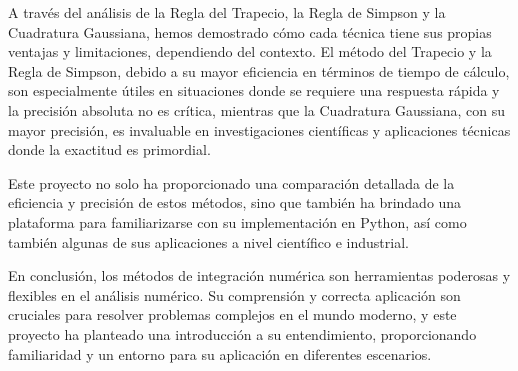 \documentclass[a4paper]{article}
\begin{document}
    A través del análisis de la Regla del Trapecio, la Regla de Simpson y la Cuadratura Gaussiana, hemos demostrado cómo cada técnica tiene sus propias ventajas y limitaciones, dependiendo del contexto. El método del Trapecio y la Regla de Simpson, debido a su mayor eficiencia en términos de tiempo de cálculo, son especialmente útiles en situaciones donde se requiere una respuesta rápida y la precisión absoluta no es crítica, mientras que la Cuadratura Gaussiana, con su mayor precisión, es invaluable en investigaciones científicas y aplicaciones técnicas donde la exactitud es primordial.
    
    Este proyecto no solo ha proporcionado una comparación detallada de la eficiencia y precisión de estos métodos, sino que también ha brindado una plataforma para familiarizarse con su implementación en Python, así como también algunas de sus aplicaciones a nivel científico e industrial.
    
    En conclusión, los métodos de integración numérica son herramientas poderosas y flexibles en el análisis numérico. Su comprensión y correcta aplicación son cruciales para resolver problemas complejos en el mundo moderno, y este proyecto ha planteado una introducción a su entendimiento, proporcionando familiaridad y un entorno para su aplicación en diferentes escenarios.    

    \printbibliography
\end{document}

